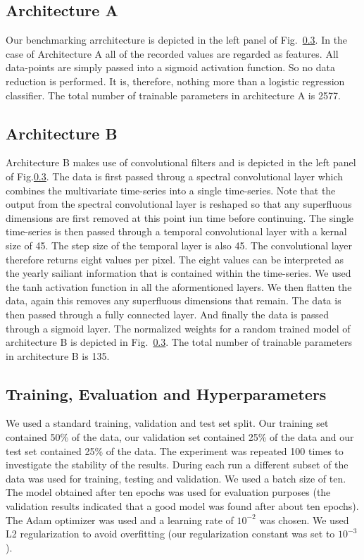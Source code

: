 \documentclass{article}
\begin{document}
\subsection{Architecture A}
Our benchmarking arrchitecture is depicted in the left panel of Fig.~\ref{}. In the case of Architecture A all of the recorded values are regarded as features. All data-points are simply passed into a sigmoid activation function. So no data reduction is performed. It is, therefore,  nothing more than a logistic regression classifier.
The total number of trainable parameters in architecture A is 2577.

\subsection{Architecture B}
Architecture B makes use of convolutional filters and is depicted in the left panel of Fig.\ref{}. The data is first passed throug a spectral convolutional layer which combines the multivariate time-series into a single time-series. Note that the output from the spectral convolutional layer is reshaped so that any superfluous dimensions are first removed at this point iun time before continuing. The single time-series is then passed through a temporal convolutional layer with a kernal size of 45. The step size of the temporal layer is also 45. The convolutional layer therefore returns eight values per pixel. The eight values can be interpreted as the yearly sailiant information that is contained within the time-series. We used the tanh activation function in all the aformentioned layers. We then flatten the data, again this removes any superfluous dimensions that remain. The data is then passed through a fully connected layer. And finally the data is passed through a sigmoid layer. The normalized weights for a random trained model of architecture B is depicted in Fig.~\ref{}. The total number of trainable parameters in architecture B is 135.
     

\subsection{Training, Evaluation and Hyperparameters}

We used a standard training, validation and test set split. Our training set contained 50\% of the data, our validation set contained 25\% of the data and our test set contained 25\% of the data. The experiment was repeated 100 times to investigate the stability of the results. During each run a different subset of the data was used for training, testing and validation. We used a batch size of ten. The model obtained after ten epochs was used for evaluation purposes (the validation results indicated that a good model was found after about ten epochs). The Adam optimizer was used and a learning rate of $10^{-2}$ was chosen. We used L2 regularization to avoid overfitting (our regularization constant was set to $10^{-3}$).    
\end{document}
